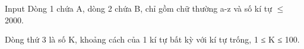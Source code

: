Input
Dòng 1 chứa A, dòng 2 chứa B, chỉ gồm chữ thường a-z và số kí tự  $\le$ 2000.  

   Dòng thứ 3 là số K, khoảng cách của 1 kí tự bất kỳ với kí tự trống, 1 ≤ K ≤ 100.